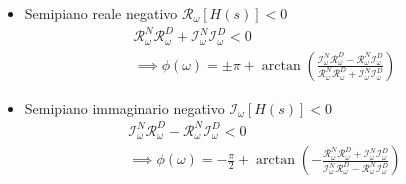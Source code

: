 \begin{itemize}
\item Semipiano reale negativo $\mathcal{R}_{\omega}[H(s)] < 0$
  \begin{equation}
    \label{eq:da-tfunc-a-fase-reale-negativo}
    \begin{gathered}
      \mathcal{R}_{\omega}^N\mathcal{R}_{\omega}^D + \mathcal{I}_{\omega}^N\mathcal{I}_{\omega}^D < 0 \\ \implies
      \phi(\omega) = \pm\pi + \arctan\left(\frac{\mathcal{I}_{\omega}^N\mathcal{R}_{\omega}^D - \mathcal{R}_{\omega}^N\mathcal{I}_{\omega}^D}{\mathcal{R}_{\omega}^N\mathcal{R}_{\omega}^D + \mathcal{I}_{\omega}^N\mathcal{I}_{\omega}^D}\right)
    \end{gathered}
  \end{equation}
\item Semipiano immaginario negativo $\mathcal{I}_{\omega}[H(s)] < 0$
  \begin{equation}
    \label{eq:da-tfunc-a-fase-immaginario-negativo}
    \begin{gathered}
      \mathcal{I}_{\omega}^N\mathcal{R}_{\omega}^D - \mathcal{R}_{\omega}^N\mathcal{I}_{\omega}^D < 0 \\ \implies
      \phi(\omega) = -\frac{\pi}{2} + \arctan\left(-\frac{\mathcal{R}_{\omega}^N\mathcal{R}_{\omega}^D + \mathcal{I}_{\omega}^N\mathcal{I}_{\omega}^D}{\mathcal{I}_{\omega}^N\mathcal{R}_{\omega}^D - \mathcal{R}_{\omega}^N\mathcal{I}_{\omega}^D}\right)
    \end{gathered}
  \end{equation}
\end{itemize}
